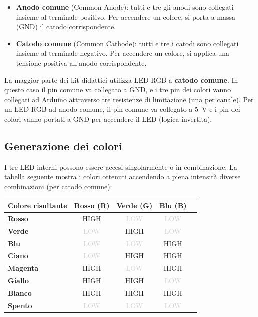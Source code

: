 \begin{itemize}
    \item \textbf{Anodo comune} (Common Anode): tutti e tre gli anodi sono collegati insieme al terminale positivo. Per accendere un colore, si porta a massa (GND) il catodo corrispondente.
    \item \textbf{Catodo comune} (Common Cathode): tutti e tre i catodi sono collegati insieme al terminale negativo. Per accendere un colore, si applica una tensione positiva all'anodo corrispondente.

\end{itemize}
\begin{tcolorbox}[colback=blue!4, colframe=blue!60, title=\textbf{Quale usare con Arduino?}]
    La maggior parte dei kit didattici utilizza LED RGB a \textbf{catodo comune}. In questo caso il pin comune va collegato a GND, e i tre pin dei colori vanno collegati ad Arduino attraverso tre resistenze di limitazione (una per canale). Per un LED RGB ad anodo comune, il pin comune va collegato a \SI{5}{\volt} e i pin dei colori vanno portati a GND per accendere il LED (logica invertita).
\end{tcolorbox}

\subsection*{Generazione dei colori}

I tre LED interni possono essere accesi singolarmente o in combinazione. La tabella seguente mostra i colori ottenuti accendendo a piena intensità diverse combinazioni (per catodo comune):

\begin{center}
\begin{tabular}{>{\bfseries}l c c c c}
    \toprule
    Colore risultante & Rosso (R) & Verde (G) & Blu (B) \\
    \midrule
    Rosso    & HIGH  & \textcolor{lightgray}{LOW} & \textcolor{lightgray}{LOW} \\
    Verde    & \textcolor{lightgray}{LOW} & HIGH  & \textcolor{lightgray}{LOW} \\
    Blu      & \textcolor{lightgray}{LOW} & \textcolor{lightgray}{LOW} & HIGH  
    \vspace{0.4cm}\\
    
    Ciano    & \textcolor{lightgray}{LOW} & HIGH  & HIGH  \\
    Magenta  & HIGH  & \textcolor{lightgray}{LOW} & HIGH \\
    Giallo   & HIGH  & HIGH  & \textcolor{lightgray}{LOW} 
        \vspace{0.4cm}\\
    Bianco   & HIGH  & HIGH  & HIGH  \\
    Spento   & \textcolor{lightgray}{LOW} & \textcolor{lightgray}{LOW} & \textcolor{lightgray}{LOW} \\
    \bottomrule
\end{tabular}
\end{center}

